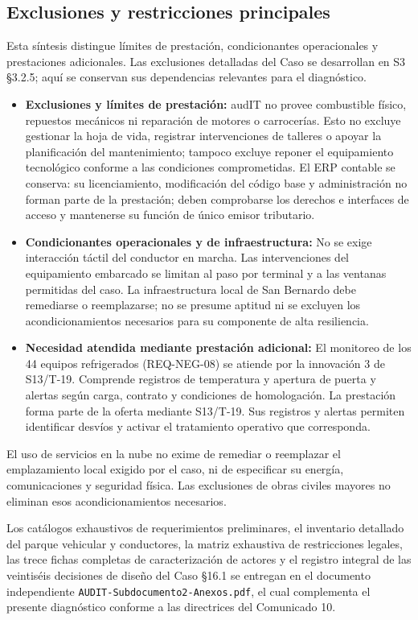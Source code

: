 \subsection{Exclusiones y restricciones principales}\label{sec:2-exclusiones}

Esta síntesis distingue límites de prestación, condicionantes operacionales y prestaciones adicionales. Las exclusiones detalladas del Caso se desarrollan en S3 §3.2.5; aquí se conservan sus dependencias relevantes para el diagnóstico.

\begin{itemize}
  \item \textbf{Exclusiones y límites de prestación:} audIT no provee combustible físico, repuestos mecánicos ni reparación de motores o carrocerías. Esto no excluye gestionar la hoja de vida, registrar intervenciones de talleres o apoyar la planificación del mantenimiento; tampoco excluye reponer el equipamiento tecnológico conforme a las condiciones comprometidas. El ERP contable se conserva: su licenciamiento, modificación del código base y administración no forman parte de la prestación; deben comprobarse los derechos e interfaces de acceso y mantenerse su función de único emisor tributario.
  \item \textbf{Condicionantes operacionales y de infraestructura:} No se exige interacción táctil del conductor en marcha. Las intervenciones del equipamiento embarcado se limitan al paso por terminal y a las ventanas permitidas del caso. La infraestructura local de San Bernardo debe remediarse o reemplazarse; no se presume aptitud ni se excluyen los acondicionamientos necesarios para su componente de alta resiliencia.
  \item \textbf{Necesidad atendida mediante prestación adicional:} El monitoreo de los 44 equipos refrigerados (REQ-NEG-08) se atiende por la innovación 3 de S13/T-19. Comprende registros de temperatura y apertura de puerta y alertas según carga, contrato y condiciones de homologación. La prestación forma parte de la oferta mediante S13/T-19. Sus registros y alertas permiten identificar desvíos y activar el tratamiento operativo que corresponda.
\end{itemize}

\vspace{0.4cm}
El uso de servicios en la nube no exime de remediar o reemplazar el emplazamiento local exigido por el caso, ni de especificar su energía, comunicaciones y seguridad física. Las exclusiones de obras civiles mayores no eliminan esos acondicionamientos necesarios.

\noindent Los catálogos exhaustivos de requerimientos preliminares, el inventario detallado del parque vehicular y conductores, la matriz exhaustiva de restricciones legales, las trece fichas completas de caracterización de actores y el registro integral de las veintiséis decisiones de diseño del Caso §16.1 se entregan en el documento independiente \texttt{AUDIT-Subdocumento2-Anexos.pdf}, el cual complementa el presente diagnóstico conforme a las directrices del Comunicado 10.

\nocite{bases-fep01, bases-fep02, bases-fep03, bases-com10, ley20123, codigo_trabajo_25bis, ley21719, ley21377, glec2023, iso14083, ds298, ds43minsal, ds158mop}
